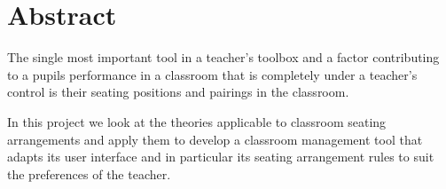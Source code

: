\section*{Abstract}
The single most important tool in a teacher's toolbox and a factor contributing to a pupils performance in a classroom that is completely under a teacher's control is their seating positions and pairings in the classroom. 

In this project we look at the theories applicable to classroom seating arrangements and apply them to develop a classroom management tool that adapts its user interface and in particular its seating arrangement rules to suit the preferences of the teacher. 
